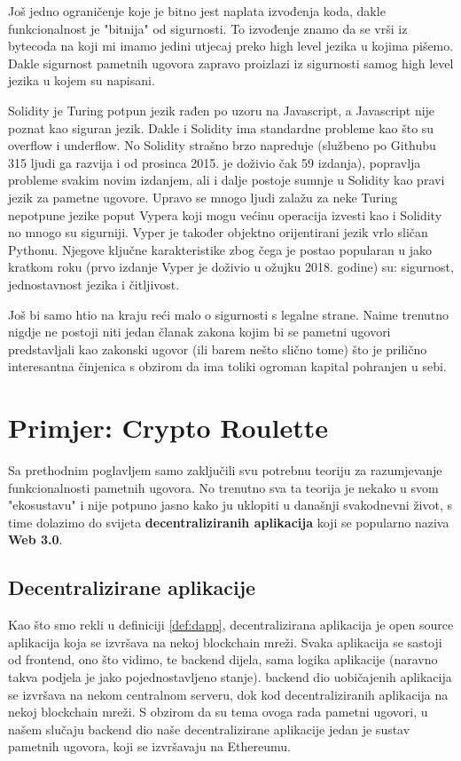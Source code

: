 \documentclass[a4paper,oneside,12pt]{memoir} %
\begin{document}
\newpage

Još jedno ograničenje koje je bitno jest naplata izvođenja koda, dakle funkcionalnost je "bitnija" od sigurnosti. To izvođenje znamo da se vrši iz bytecoda na koji mi imamo jedini utjecaj preko high level jezika u kojima pišemo. Dakle sigurnost pametnih ugovora zapravo proizlazi iz sigurnosti samog high level jezika u kojem su napisani.

Solidity je Turing potpun jezik rađen po uzoru na Javascript, a Javascript nije poznat kao siguran jezik. Dakle i Solidity ima standardne probleme kao što su overflow i underflow. No Solidity strašno brzo napreduje (službeno po Githubu 315 ljudi ga razvija i od prosinca 2015. je doživio čak 59 izdanja), popravlja probleme svakim novim izdanjem, ali i dalje postoje sumnje u Solidity kao pravi jezik za pametne ugovore. Upravo se mnogo ljudi zalažu za neke Turing nepotpune jezike poput Vypera koji mogu većinu operacija izvesti kao i Solidity no mnogo su sigurniji. Vyper je također objektno orijentirani jezik vrlo sličan Pythonu. Njegove ključne karakteristike zbog čega je postao popularan u jako kratkom roku (prvo izdanje Vyper je doživio u ožujku 2018. godine) su: sigurnost, jednostavnost jezika i čitljivost. 

Još bi samo htio na kraju reći malo o sigurnosti s legalne strane. Naime trenutno nigdje ne postoji niti jedan članak zakona kojim bi se pametni ugovori predstavljali kao zakonski ugovor (ili barem nešto slično tome) što je prilično interesantna činjenica s obzirom da ima toliki ogroman kapital pohranjen u sebi.
    
\chapter{Primjer: Crypto Roulette}

Sa prethodnim poglavljem samo zaključili svu potrebnu teoriju za razumjevanje funkcionalnosti pametnih ugovora. No trenutno sva ta teorija je nekako u svom "ekosustavu" i nije potpuno jasno kako ju uklopiti u današnji svakodnevni život, s time dolazimo do svijeta \textbf{decentraliziranih aplikacija} koji se popularno naziva \textbf{Web 3.0}.

\section{Decentralizirane aplikacije}

Kao što smo rekli u definiciji \ref{def:dapp}, decentralizirana aplikacija je open source aplikacija koja se izvršava na nekoj blockchain mreži. Svaka aplikacija se sastoji od frontend, ono što vidimo, te backend dijela, sama logika aplikacije (naravno takva podjela je jako pojednostavljeno stanje). backend dio uobičajenih aplikacija se izvršava na nekom centralnom serveru, dok kod decentraliziranih aplikacija na nekoj blockchain mreži. S obzirom da su tema ovoga rada pametni ugovori, u našem slučaju backend dio naše decentralizirane aplikacije jedan je sustav pametnih ugovora, koji se izvršavaju na Ethereumu. 
\end{document}
